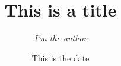 \documentclass[11pt,twoside,titlepage,a4paper]{report}
\begin{document}
\title{\Huge{\textbf{This is a title}}}
\author{\textit{I'm the author}}
\date{This is the date}
\maketitle

\tableofcontents
\clearpage

\end{document}

